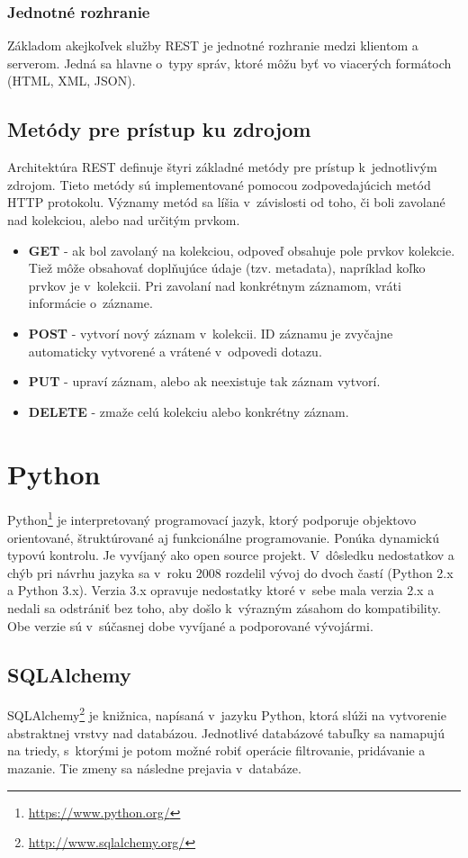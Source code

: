 \documentclass[slovak]{fitthesis}
\begin{document}
\subsubsection{Jednotné rozhranie}
Základom akejkoľvek služby REST je jednotné rozhranie medzi klientom a serverom. Jedná sa hlavne o~typy správ, ktoré môžu byť vo viacerých formátoch (HTML, XML, JSON).

\subsection{Metódy pre prístup ku zdrojom}\label{httpMetody}
Architektúra REST definuje štyri základné metódy pre prístup k~jednotlivým zdrojom. Tieto metódy sú implementované pomocou zodpovedajúcich metód HTTP protokolu. Významy metód sa líšia v~závislosti od toho, či boli zavolané nad kolekciou, alebo nad určitým prvkom.
\begin{itemize}
    \item \textbf{GET} - ak bol zavolaný na kolekciou, odpoveď obsahuje pole prvkov kolekcie. Tiež môže obsahovať doplňujúce údaje (tzv. metadata), napríklad koľko prvkov je v~kolekcii.
    Pri zavolaní nad konkrétnym záznamom, vráti informácie o~zázname.
    \item \textbf{POST} - vytvorí nový záznam v~kolekcii. ID záznamu je zvyčajne automaticky vytvorené a vrátené v~odpovedi dotazu.
    \item \textbf{PUT} - upraví záznam, alebo ak neexistuje tak záznam vytvorí.
    \item \textbf{DELETE} - zmaže celú kolekciu alebo konkrétny záznam.
\end{itemize}

\section{Python}\label{python}
Python\footnote{\url{https://www.python.org/}} je interpretovaný programovací jazyk, ktorý podporuje objektovo orientované, štruktúrované aj funkcionálne programovanie. Ponúka dynamickú typovú kontrolu. Je vyvíjaný ako open source projekt. V~dôsledku nedostatkov a chýb pri návrhu jazyka sa v~roku 2008 rozdelil vývoj do dvoch častí (Python 2.x a Python 3.x). Verzia 3.x opravuje nedostatky ktoré v~sebe mala verzia 2.x a nedali sa odstrániť bez toho, aby došlo k~výrazným zásahom do kompatibility. Obe verzie sú v~súčasnej dobe vyvíjané a podporované vývojármi.

\subsection{SQLAlchemy}\label{SQLAlchemy}
SQLAlchemy\footnote{\url{http://www.sqlalchemy.org/}} je knižnica, napísaná v~jazyku Python, ktorá slúži na vytvorenie abstraktnej vrstvy nad databázou. Jednotlivé databázové tabuľky sa namapujú na triedy, s~ktorými je potom možné robiť operácie filtrovanie, pridávanie a mazanie. Tie zmeny sa následne prejavia v~databáze.
\end{document}
